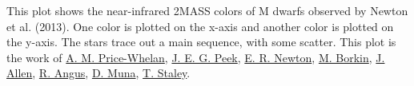 This plot shows the near-infrared 2MASS colors of M dwarfs observed by Newton et al. (2013). One color is plotted on the x-axis and another color is plotted on the y-axis. The stars trace out a main sequence, with some scatter. This plot is the work of \href{http://adrian.pw}{A. M. Price-Whelan}, \href{http://www.astro.columbia.edu/~jpeek/}{J. E. G. Peek}, \href{https://www.cfa.harvard.edu/~enewton/}{E. R. Newton}, \href{http://people.seas.harvard.edu/~borkin/}{M. Borkin}, \href{http://www.physics.usyd.edu.au/~jallen/}{J. Allen}, \href{http://www.ruthangus.co.uk/}{R. Angus}, \href{}{D. Muna}, \href{http://www.ast.cam.ac.uk/~ts337/}{T. Staley}. 